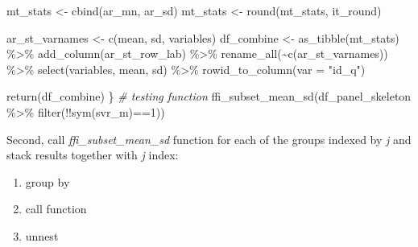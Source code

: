 \documentclass[
]{book}
\newenvironment{Shaded}{\begin{snugshade}}{\end{snugshade}}
\newcommand{\AttributeTok}[1]{\textcolor[rgb]{0.77,0.63,0.00}{#1}}
\newcommand{\CommentTok}[1]{\textcolor[rgb]{0.56,0.35,0.01}{\textit{#1}}}
\newcommand{\DecValTok}[1]{\textcolor[rgb]{0.00,0.00,0.81}{#1}}
\newcommand{\FunctionTok}[1]{\textcolor[rgb]{0.00,0.00,0.00}{#1}}
\newcommand{\NormalTok}[1]{#1}
\newcommand{\OtherTok}[1]{\textcolor[rgb]{0.56,0.35,0.01}{#1}}
\newcommand{\SpecialCharTok}[1]{\textcolor[rgb]{0.00,0.00,0.00}{#1}}
\newcommand{\StringTok}[1]{\textcolor[rgb]{0.31,0.60,0.02}{#1}}
\providecommand{\tightlist}{%
  \setlength{\itemsep}{0pt}\setlength{\parskip}{0pt}}
\begin{document}
\begin{Shaded}
\begin{Highlighting}[]
\NormalTok{  mt\_stats }\OtherTok{\textless{}{-}} \FunctionTok{cbind}\NormalTok{(ar\_mn, ar\_sd)}
\NormalTok{  mt\_stats }\OtherTok{\textless{}{-}} \FunctionTok{round}\NormalTok{(mt\_stats, it\_round)}
  
\NormalTok{  ar\_st\_varnames }\OtherTok{\textless{}{-}} \FunctionTok{c}\NormalTok{(}\StringTok{\textquotesingle{}mean\textquotesingle{}}\NormalTok{, }\StringTok{\textquotesingle{}sd\textquotesingle{}}\NormalTok{, }\StringTok{\textquotesingle{}variables\textquotesingle{}}\NormalTok{)}
\NormalTok{  df\_combine }\OtherTok{\textless{}{-}} \FunctionTok{as\_tibble}\NormalTok{(mt\_stats) }\SpecialCharTok{\%\textgreater{}\%} 
    \FunctionTok{add\_column}\NormalTok{(ar\_st\_row\_lab) }\SpecialCharTok{\%\textgreater{}\%}
    \FunctionTok{rename\_all}\NormalTok{(}\SpecialCharTok{\textasciitilde{}}\FunctionTok{c}\NormalTok{(ar\_st\_varnames)) }\SpecialCharTok{\%\textgreater{}\%}
    \FunctionTok{select}\NormalTok{(variables, }\StringTok{\textquotesingle{}mean\textquotesingle{}}\NormalTok{, }\StringTok{\textquotesingle{}sd\textquotesingle{}}\NormalTok{) }\SpecialCharTok{\%\textgreater{}\%}
    \FunctionTok{rowid\_to\_column}\NormalTok{(}\AttributeTok{var =} \StringTok{"id\_q"}\NormalTok{)}
    
  \FunctionTok{return}\NormalTok{(df\_combine)}
\NormalTok{\}}
\CommentTok{\# testing function}
\FunctionTok{ffi\_subset\_mean\_sd}\NormalTok{(df\_panel\_skeleton }\SpecialCharTok{\%\textgreater{}\%} \FunctionTok{filter}\NormalTok{(}\SpecialCharTok{!!}\FunctionTok{sym}\NormalTok{(svr\_m)}\SpecialCharTok{==}\DecValTok{1}\NormalTok{))}
\end{Highlighting}
\end{Shaded}

Second, call \emph{ffi\_subset\_mean\_sd} function for each of the groups indexed by \emph{j} and stack results together with \emph{j} index:

\begin{enumerate}
\def\labelenumi{\arabic{enumi}.}
\tightlist
\item
  group by
\item
  call function
\item
  unnest
\end{enumerate}
\end{document}
